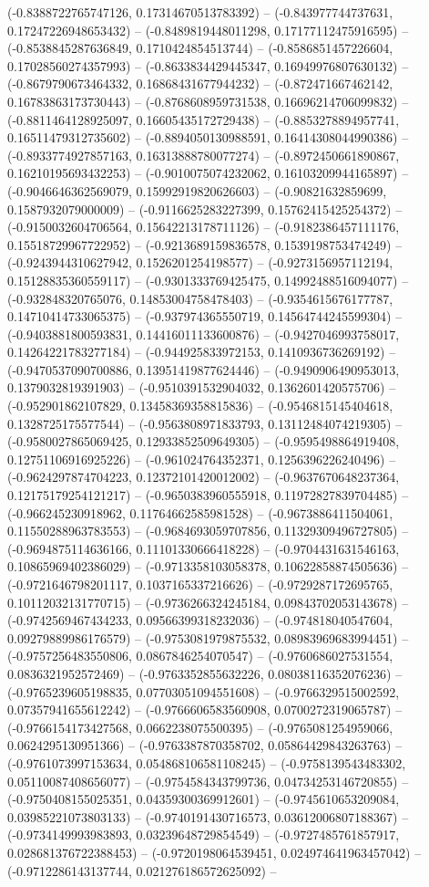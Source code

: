 (-0.8388722765747126, 0.17314670513783392) -- (-0.843977744737631, 0.17247226948653432) -- (-0.8489819448011298, 0.17177112475916595) -- (-0.8538845287636849, 0.1710424854513744) -- (-0.8586851457226604, 0.17028560274357993) -- (-0.8633834429445347, 0.16949976807630132) -- (-0.8679790673464332, 0.16868431677944232) -- (-0.872471667462142, 0.16783863173730443) -- (-0.8768608959731538, 0.16696214706099832) -- (-0.8811464128925097, 0.16605435172729438) -- (-0.8853278894957741, 0.16511479312735602) -- (-0.8894050130988591, 0.16414308044990386) -- (-0.8933774927857163, 0.16313888780077274) -- (-0.8972450661890867, 0.16210195693432253) -- (-0.9010075074232062, 0.16103209944165897) -- (-0.9046646362569079, 0.15992919820626603) -- (-0.90821632859699, 0.1587932079000009) -- (-0.9116625283227399, 0.15762415425254372) -- (-0.9150032604706564, 0.15642213178711126) -- (-0.9182386457111176, 0.15518729967722952) -- (-0.9213689159836578, 0.1539198753474249) -- (-0.9243944310627942, 0.1526201254198577) -- (-0.9273156957112194, 0.15128835360559117) -- (-0.9301333769425475, 0.14992488516094077) -- (-0.932848320765076, 0.14853004758478403) -- (-0.9354615676177787, 0.14710414733065375) -- (-0.937974365550719, 0.14564744245599304) -- (-0.9403881800593831, 0.14416011133600876) -- (-0.9427046993758017, 0.14264221783277184) -- (-0.944925833972153, 0.1410936736269192) -- (-0.9470537090700886, 0.13951419877624446) -- (-0.9490906490953013, 0.1379032819391903) -- (-0.9510391532904032, 0.1362601420575706) -- (-0.952901862107829, 0.13458369358815836) -- (-0.9546815145404618, 0.1328725175577544) -- (-0.9563808971833793, 0.13112484074219305) -- (-0.9580027865069425, 0.12933852509649305) -- (-0.9595498864919408, 0.12751106916925226) -- (-0.961024764352371, 0.1256396226240496) -- (-0.9624297874704223, 0.12372101420012002) -- (-0.9637670648237364, 0.12175179254121217) -- (-0.9650383960555918, 0.11972827839704485) -- (-0.966245230918962, 0.11764662585981528) -- (-0.9673886411504061, 0.11550288963783553) -- (-0.9684693059707856, 0.11329309496727805) -- (-0.9694875114636166, 0.11101330666418228) -- (-0.9704431631546163, 0.10865969402386029) -- (-0.9713358103058378, 0.10622858874505636) -- (-0.9721646798201117, 0.1037165337216626) -- (-0.9729287172695765, 0.10112032131770715) -- (-0.9736266324245184, 0.09843702053143678) -- (-0.9742569467434233, 0.09566399318232036) -- (-0.974818040547604, 0.09279889986176579) -- (-0.9753081979875532, 0.08983969683994451) -- (-0.9757256483550806, 0.0867846254070547) -- (-0.9760686027531554, 0.0836321952572469) -- (-0.9763352855632226, 0.08038116352076236) -- (-0.9765239605198835, 0.07703051094551608) -- (-0.9766329515002592, 0.07357941655612242) -- (-0.9766606583560908, 0.0700272319065787) -- (-0.9766154173427568, 0.0662238075500395) -- (-0.9765081254959066, 0.0624295130951366) -- (-0.9763387870358702, 0.05864429843263763) -- (-0.9761073997153634, 0.054868106581108245) -- (-0.9758139543483302, 0.05110087408656077) -- (-0.9754584343799736, 0.04734253146720855) -- (-0.9750408155025351, 0.04359300369912601) -- (-0.9745610653209084, 0.03985221073803133) -- (-0.9740191430716573, 0.03612006807188367) -- (-0.9734149993983893, 0.03239648729854549) -- (-0.9727485761857917, 0.028681376722388453) -- (-0.9720198064539451, 0.024974641963457042) -- (-0.9712286143137744, 0.021276186572625092) -- 